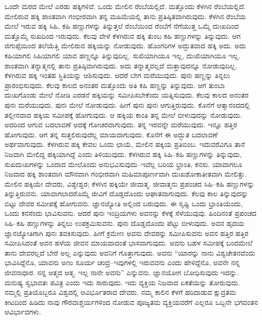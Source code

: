 ಒಂದೇ ಮರದ ಮೇಲೆ ಎರಡು ಹಕ್ಕಿಗಳಿವೆ. ಒಂದು ಮೇಲಿನ ರೆಂಬೆಯಲ್ಲಿದೆ. ಮತ್ತೊಂದು ಕೆಳಗಿನ ರೆಂಬೆಯಲ್ಲಿದೆ. ಮೇಲಿರುವ ಹಕ್ಕಿ ಶಾಂತವಾಗಿ ಗಂಭೀರವಾಗಿ ತನ್ನ ಮಹಿಮೆಯಲ್ಲಿ ತಾನು ಪ್ರತಿಷ್ಠಿತವಾಗಿರುವುದು. ಕೆಳಗಿನ ರೆಂಬೆಯ ಮೇಲೆ ಇರುವ ಹಕ್ಕಿ ಸಿಹಿ, ಕಹಿ ಹಣ್ಣುಗಳನ್ನು ತಿನ್ನುತ್ತಲೆ ರೆಂಬೆಯಿಂದ ರೆಂಬೆಗೆ ನೆಗೆಯುತ್ತ ಒಮ್ಮೆ ದುಃಖದಿಂದ ಮತ್ತೊಮ್ಮೆ ಸುಖದಿಂದ ಇರುವುದು. ಕೆಲವು ವೇಳೆ ಕೆಳಗಿರುವ ಹಕ್ಕಿ ತುಂಬ ಕಹಿ ಹಣ್ಣುಗಳನ್ನು ತಿನ್ನುವುದು. ಆಗ ಜಿಗುಪ್ಸೆಯಿಂದ ತಲೆಯೆತ್ತಿ ಮೇಲಿರುವ ಹಕ್ಕಿಯನ್ನು ನೋಡುವುದು. ಹೊಂಗರಿಗಳ ಅದ್ಭುತವಾದ ಹಕ್ಕಿ ಅದು. ಅದು ಕಹಿಯಾಗಲಿ ಸಿಹಿಯಾಗಲಿ ಯಾವ ಹಣ್ಣನ್ನೂ ತಿನ್ನುವುದಿಲ್ಲ. ಸುಖಿಯಾಗಿಯೂ ಇಲ್ಲ, ದುಃಖಿಯಾಗಿಯೂ ಇಲ್ಲ. ಶಾಂತವಾಗಿ ತನ್ನಾತ್ಮನಲ್ಲಿ ತಾನು ಪ್ರತಿಷ್ಠಿವಾಗಿರುವುದು. ಅದು ತನ್ನಾತ್ಮವಲ್ಲದೆ ಮತ್ತಾವುದನ್ನೂ ನೋಡುವುದಿಲ್ಲ. ಕೆಳಗಿರುವ ಹಕ್ಕಿ ಇಂತಹ ಸ್ಥಿತಿಯನ್ನು ಆಶಿಸುವುದು. ಆದರೆ ಬೇಗ ಮರೆಯುವುದು. ಪುನಃ ಹಣ್ಣನ್ನು ತಿನ್ನಲು ಪ್ರಾರಂಭಿಸುವುದು. ಕೆಲವು ಕಾಲದ ಅನಂತರ ಮತ್ತೊಂದು ಅತಿ ಕಹಿ ಹಣ್ಣನ್ನು ತಿನ್ನುವುದು. ಆಗ ತುಂಬಾ ದುಃಖಗೊಂಡು ಮೇಲೆ ನೋಡಿ ಎರಡನೆ ಹಕ್ಕಿಯನ್ನು ಸಮೀಪಿಸಬೇಕೆಂದು ಯತ್ನಿಸುವುದು. ಕೆಲವು ಕಾಲದ ಅನಂತರ ಪುನಃ ಮರೆಯುವುದು. ಪುನಃ ಮೇಲೆ ನೋಡುವುದು. ಹೀಗೆ ಪುನಃ ಪುನಃ ಆಗುತ್ತಿರುವುದು. ಕೊನೆಗೆ ಆತ್ಮಾನಂದದಲ್ಲಿ ತಲ್ಲೀನವಾದ ಹಕ್ಕಿಯ ಸಮೀಪಕ್ಕೆ ಹೋಗುವುದು. ಆ ಹಕ್ಕಿಯ ಕಾಂತಿ ತನ್ನ ಮೇಲೆ ಬೀಳುವುದನ್ನು ನೋಡುವುದು. ಅದರಿಂದ ಆಗುವ ಬದಲಾವಣೆ ಅದಕ್ಕೆ ಗೋಚರವಾಗುವುದು. ತನ್ನ ಇರವನ್ನೇ ಮರೆಯುವುದು. ಇನ್ನೂ ಹತ್ತಿರ ಹೋಗುವುದು. ಆಗ ತನ್ನ ಸುತ್ತಲಿರುವುದೆಲ್ಲ ಮಾಯವಾಗುವುದು. ಕೊನೆಗೆ ಈ ಅದ್ಭುತ ಬದಲಾವಣೆ ಅರ್ಥವಾಗುವುದು. ಕೆಳಗಿರುವ ಹಕ್ಕಿ ಕೇವಲ ಒಂದು ಛಾಯೆ, ಮೇಲಿನ ಹಕ್ಕಿಯ ಪ್ರತಿಬಿಂಬ. ಇದುವರೆವಿಗೂ ತಾನೆ ನಿಜವಾಗಿ ಮೇಲಿದ್ದ ಹಕ್ಕಿಯಾಗಿದ್ದೆ ಎಂದು ತಿಳಿಯುವುದು. ಕೆಳಗಿರುವ ಹಕ್ಕಿ ಸಿಹಿ–ಕಹಿ ಹಣ್ಣುಗಳನ್ನು ತಿನ್ನುವುದು, ಸುಖದುಃಖಗಳನ್ನು ಒಂದಾದ ಮೇಲೊಂದು ಅನುಭವಿಸುವುದು–ಇವೆಲ್ಲ ಬರಿಯ ಭ್ರಾಂತಿ, ಕನಸು. ಯಾವಾಗಲೂ ನಿಜವಾದ ಹಕ್ಕಿ ಶಾಂತವಾಗಿ ಮೌನವಾಗಿ ಗಂಭೀರವಾಗಿ ಮಹಿಮಾಪೂರ್ಣವಾಗಿ ದುಃಖಶೋಕಾತೀತವಾಗಿ ಮೇಲಿತ್ತು. ಮೇಲಿನ ಹಕ್ಕಿಯೇ ದೇವರು, ವಿಶ್ವೇಶ್ವರ; ಕೆಳಗಿನ ಹಕ್ಕಿಯೇ ಜೀವಾತ್ಮ. ಜೀವಾತ್ಮನು ಪ್ರಪಂಚದ ಸಿಹಿ–ಕಹಿ ಹಣ್ಣುಗಳನ್ನು ತಿನ್ನುತ್ತಿರುವನು. ಯಾವಾಗಲಾದರೊಮ್ಮೆ ಜೀವಿಗೆ ದೊಡ್ಡದೊಂದು ಆಘಾತವಾಗುವುದು. ಕೆಲವು ಕಾಲ ತಿನ್ನುವುದನ್ನು ಬಿಟ್ಟು ದೇವರ ಸಮೀಪಕ್ಕೆ ಹೋಗುವನು. ಜ್ಞಾನಜ್ಯೋತಿ ಅಲ್ಲಿಂದ ಬರುವುದು. ಈ ಸೃಷ್ಟಿ ಒಂದು ಭ್ರಾಂತಿಯೆಂದು, ಒಂದು ಕನಸೆಂದು ಭಾವಿಸುವನು. ಆದರೆ ಪುನಃ ಇಂದ್ರಿಯಗಳು ಅವನನ್ನು ಕೆಳಕ್ಕೆ ಸೆಳೆಯುವುವು. ಹಿಂದಿನಂತೆ ಪ್ರಪಂಚದ ಸಿಹಿ–ಕಹಿ ಹಣ್ಣುಗಳನ್ನು ತಿನ್ನಲು ಉಪಕ್ರಮಿಸುವನು. ಪುನಃ ದೊಡ್ಡದೊಂದು ಪೆಟ್ಟು ಬೀಳುವುದು. ಅವನ ಹೃದಯ ಜ್ಞಾನಜ್ಯೋತಿಗಾಗಿ ಪುನಃ ತವಕಿಸುವುದು. ಹೀಗೆ ಕ್ರಮೇಣ ಅವನು ದೇವರನ್ನು ಸಮೀಪಿಸುವನು ಅವನ ಹತ್ತಿರ ಹತ್ತಿರ ಸಮೀಪಿಸಿದಂತೆ ಅವನ ಹಳೆಯ ಜೀವನ ಮಾಯವಾದಂತೆ ಭಾಸವಾಗುವುದು. ಅವನು ಬಹಳ ಸಮೀಪಕ್ಕೆ ಬಂದಮೇಲೆ ತಾನು ದೇವರಲ್ಲದೆ ಬೇರೆ ಅಲ್ಲ ಎನ್ನುವುದು ಅವನಿಗೆ ಗೊತ್ತಾಗುವುದು. ಅವನು “ಯಾರನ್ನು ನಾನು ವಿಶ್ವಚೇತನವೆಂದು ಭಾವಿಸಿದ್ದೆನೊ, ಯಾವನು ಅಣು ಸೂರ್ಯ ಚಂದ್ರ–ಇವುಗಳಲ್ಲಿ ಇರುವವನು ಎಂದು ಹೇಳಿದ್ದೆನೊ, ಅವನೇ ನನ್ನ ಜೀವನಾಧಾರ. ನನ್ನ ಆತ್ಮದ ಆತ್ಮ. ಇಲ್ಲ ನಾನೇ ಅವನು” ಎನ್ನುವನು. ಜ್ಞಾನಯೋಗ ಬೋಧಿಸುವುದು ಇದನ್ನು. ಮನುಷ್ಯ ಸ್ವಭಾವತಃ ಪವಿತ್ರ ಎಂದು ಇದು ಸಾರುವುದು. ಇದು ವ್ಯಕ್ತಿಯ ನಿಜವಾದ ಏಕತೆಯನ್ನು ತೋರುವುದು. ನಮ್ಮಲ್ಲಿ ಪ್ರತಿಯೊಬ್ಬರೂ ವಿಶ್ವದಲ್ಲಿ ಆವಿರ್ಭೂತರಾದ ದೇವರು. ನಮ್ಮ ಕಾಲಿನ ಕೆಳಗೆ ಹರಿದಾಡುವ ಕ್ಷುದ್ರತಮ ಕೀಟದಿಂದ ಹಿಡಿದು ನಾವು ಗೌರವಾಶ್ಚರ್ಯಗಳಿಂದ ನೋಡುವ ಪೂಜ್ಯತಮ ವ್ಯಕ್ತಿಯವರೆಗೆ ಎಲ್ಲರೂ ಒಬ್ಬನೇ ಭಗವಂತನ ಆವಿರ್ಭಾವಗಳು.

